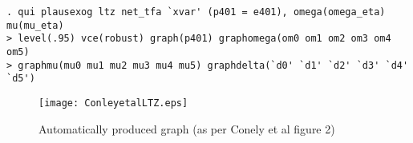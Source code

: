 \documentclass{article}[11pt] %
\begin{document}
\begin{spacing}{1}
\begin{verbatim}
. qui plausexog ltz net_tfa `xvar' (p401 = e401), omega(omega_eta) mu(mu_eta)
> level(.95) vce(robust) graph(p401) graphomega(om0 om1 om2 om3 om4 om5)
> graphmu(mu0 mu1 mu2 mu3 mu4 mu5) graphdelta(`d0' `d1' `d2' `d3' `d4' `d5')

\end{verbatim} 

\begin{figure}[htpb]
\begin{center}
\texttt{[image: ConleyetalLTZ.eps]}
\caption{Automatically produced graph (as per Conely et al figure 2)}
\label{fig:LTZ}
\end{center}
\end{figure}



\end{spacing}
\end{document}
